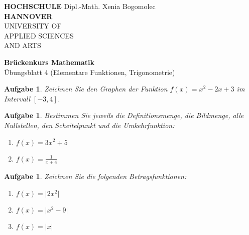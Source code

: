 \documentclass[12pt]{article}
\newtheorem{exercise}[satz]{Aufgabe}
\begin{document}
\pagestyle{empty}
\parindent 0cm
\begin{minipage}{14cm}
\footnotesize{\textbf{HOCHSCHULE} \hfill Dipl.-Math. Xenia Bogomolec\\
\textbf{HANNOVER}\\
  UNIVERSITY OF\\
  APPLIED SCIENCES\\
  AND ARTS
  }
\end{minipage}
\vspace{1.0cm}

\begin{center}
   {\Large \bf Br\"uckenkurs Mathematik} \\
   \vspace{0.5cm}
   {\large \"Ubungsblatt 4 (Elementare Funktionen, Trigonometrie)}  \\
\end{center}

\vspace{0.5cm}
\normalsize
\parindent0cm

\begin{exercise}
    Zeichnen Sie den Graphen der Funktion $f(x) = x^2-2x+3$ im Intervall $[-3,4]$.
\end{exercise}

\vspace{0.1cm}

\begin{exercise}
  Bestimmen Sie jeweils die Definitionsmenge, die Bildmenge, alle Nullstellen, den Scheitelpunkt und die Umkehrfunktion:
  \begin{enumerate}
    \item[(a)] $f(x) = 3x^2+5$
    \item[(b)] $f(x) = \frac{1}{x+4}$ 
  \end{enumerate}
\end{exercise}

\vspace{0.1cm}

\begin{exercise}
  Zeichnen Sie die folgenden Betragsfunktionen:
  \begin{enumerate}
    \item[(a)] $f(x) = \vert 2x^2 \vert$ 
    \item[(b)] $f(x) = \vert x^2 - 9 \vert$
    \item[(c)]$f(x) = \vert x \vert$
  \end{enumerate}
\end{exercise} 
\end{document}
